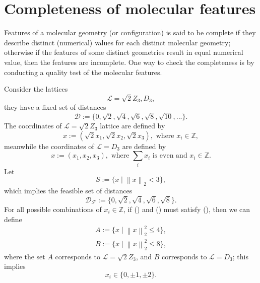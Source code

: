 \documentclass[12pt]{article}
\begin{document}
\section{Completeness of molecular features}
Features of a molecular geometry (or configuration) is said to be complete if they describe distinct (numerical) values for each distinct molecular geometry; otherwise if the features of some distinct geometries result in equal numerical value, then the features are incomplete. One way to check the completeness is by conducting a quality test of the molecular features.

Consider the lattices
\begin{equation}
    \mathcal{L} = \sqrt{2}Z_3, D_3,
\end{equation}
they have a fixed set of distances
\begin{equation}
    \mathcal{D} := \{0, \sqrt{2}, \sqrt{4}, \sqrt{6}, \sqrt{8}, \sqrt{10}, ...\}.
\end{equation}
The coordinates of $\mathcal{L} = \sqrt{2}Z_3$ lattice are defined by
\begin{equation}
    x:= (\sqrt{2}x_1, \sqrt{2}x_2, \sqrt{2}x_3), \text{ where } x_i \in \mathbb{Z},
    \label{eq:completeness_Z_set}
\end{equation}
meanwhile the coordinates of $\mathcal{L} = D_3$ are defined by
\begin{equation}
    x:= (x_1, x_2, x_3), \text{ where } \sum_i x_i \text{ is even and } x_i \in \mathbb{Z}.
    \label{eq:completeness_D_set}
\end{equation}
Let
\begin{equation}
    S := \{x \mid \left\| x\right\|_2 < 3 \},
    \label{eq:completeness_distance_set}
\end{equation}
which implies the feasible set of distances
\begin{equation}
    \mathcal{D_F} := \{0, \sqrt{2}, \sqrt{4}, \sqrt{6}, \sqrt{8}\}.
\end{equation}
For all possible combinations of $x_i \in \mathbb{Z}$, if () and () must satisfy (), then we can define
\begin{equation}
    \begin{split}
        A:= \{ x \mid \left\| x \right\|_2^2 \leq 4\}, \\
        B:= \{ x \mid \left\| x \right\|_2^2 \leq 8\},
    \end{split}
    \label{eq:completeness_lattice_set}
\end{equation}
where the set $A$ corresponds to $\mathcal{L} = \sqrt{2}Z_3$, and $B$ corresponds to $\mathcal{L} = D_3$; this implies
\begin{equation}
    x_i \in \{0, \pm 1, \pm 2\}.
\end{equation}
\end{document}
